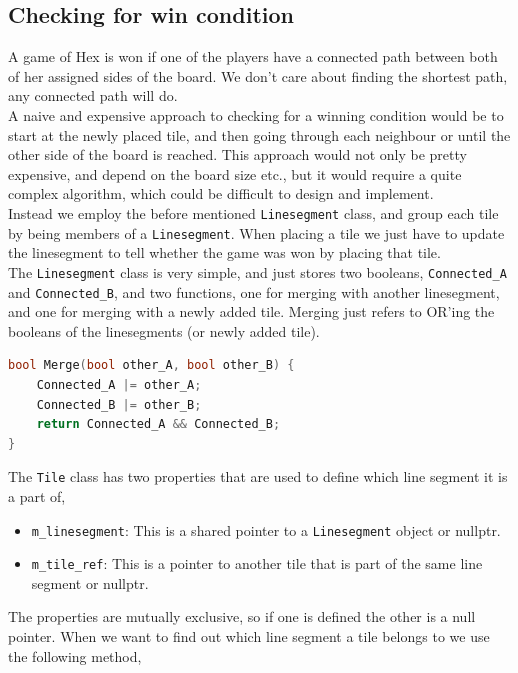 \documentclass[a4paper]{article}
\begin{document}
\subsection{Checking for win condition}
A game of Hex is won if one of the players have a connected path between both of her assigned sides of the board. We don't care about finding the shortest path, any connected path will do.\\
A naive and expensive approach to checking for a winning condition would be to start at the newly placed tile, and then going through each neighbour or until the other side of the board is reached. This approach would not only be pretty expensive, and depend on the board size etc., but it would require a quite complex algorithm, which could be difficult to design and implement.\\
Instead we employ the before mentioned \texttt{Linesegment} class, and group each tile by being members of a \texttt{Linesegment}. When placing a tile we just have to update the linesegment to tell whether the game was won by placing that tile.\\ 
The \texttt{Linesegment} class is very simple, and just stores two booleans, \texttt{Connected\_A} and \texttt{Connected\_B}, and two functions, one for merging with another linesegment, and one for merging with a newly added tile. Merging just refers to OR'ing the booleans of the linesegments (or newly added tile).
\begin{lstlisting}[language=C++]
bool Merge(bool other_A, bool other_B) {
    Connected_A |= other_A;
    Connected_B |= other_B;
    return Connected_A && Connected_B;
}
\end{lstlisting}
The \texttt{Tile} class has two properties that are used to define which line segment it is a part of,
\begin{itemize}
    \item \texttt{m\_linesegment}: This is a shared pointer to a \texttt{Linesegment} object or nullptr.
    \item \texttt{m\_tile\_ref}: This is a pointer to another tile that is part of the same line segment or nullptr.
\end{itemize}
The properties are mutually exclusive, so if one is defined the other is a null pointer.
When we want to find out which line segment a tile belongs to we use the following method,
\end{document}
